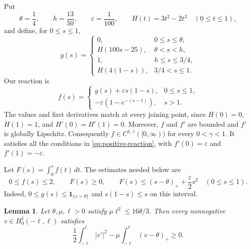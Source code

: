 \documentclass[11pt]{article}
\newtheorem{lemma}[theorem]{Lemma}
\begin{document}
Put
\[
 \theta=\frac14,\qquad h=\frac{13}{50},\qquad \varepsilon=\frac1{100},
 \qquad H(t)=3t^2-2t^3\quad(0\le t\le1),
\]
and define, for \(0\le s\le1\),
\[
 g(s)=
 \begin{cases}
  0,&0\le s\le\theta,\\
  H(100s-25),&\theta<s<h,\\
  1,&h\le s\le3/4,\\
  H(4(1-s)),&3/4<s\le1.
 \end{cases}
\]
Our reaction is
\begin{equation}\label{eq:reaction}
 f(s)=
 \begin{cases}
  g(s)+\varepsilon s(1-s),&0\le s\le1,\\
  -\varepsilon(1-e^{-(s-1)}),&s>1.
 \end{cases}
\end{equation}
The values and first derivatives match at every joining point, since
\(H(0)=0\), \(H(1)=1\), and \(H'(0)=H'(1)=0\).
Moreover, \(f\) and \(f'\) are bounded and \(f'\) is globally Lipschitz.
Consequently \(f\in C^{1,\gamma}([0,\infty))\) for every \(0<\gamma<1\).
It satisfies all the conditions in \eqref{eq:positive-reaction}, with
\(f'(0)=\varepsilon\) and \(f'(1)=-\varepsilon\).

Let \(F(s)=\int_0^s f(t)\,dt\). The estimates needed below are
\begin{equation}\label{eq:primitive}
 0\le f(s)\le2,\qquad F(s)\ge0,\qquad
 F(s)\le(s-\theta)_++\frac{\varepsilon}{2}s^2
 \quad(0\le s\le1).
\end{equation}
Indeed, \(0\le g(s)\le\mathbf1_{\{s>\theta\}}\) and
\(s(1-s)\le s\) on this interval.

\begin{lemma}\label{lem:interval}
Let \(\theta,\mu,\ell>0\) satisfy
\(\mu\ell^2\le16\theta/3\).
Then every nonnegative \(v\in H^1_0(-\ell,\ell)\) satisfies
\begin{equation}\label{eq:interval}
 \frac12\int_{-\ell}^{\ell}|v'|^2
 -\mu\int_{-\ell}^{\ell}(v-\theta)_+\ge0.
\end{equation}
\end{lemma}
\end{document}
